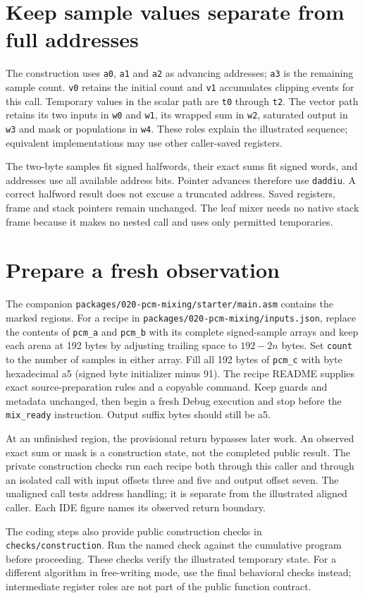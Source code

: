\section{Keep sample values separate from full addresses}
The construction uses \texttt{a0}, \texttt{a1} and \texttt{a2} as advancing addresses;
\texttt{a3} is the remaining sample count. \texttt{v0} retains the initial count and
\texttt{v1} accumulates clipping events for this call. Temporary values in the scalar
path are \texttt{t0} through \texttt{t2}. The vector path retains its two inputs in
\texttt{w0} and \texttt{w1}, its wrapped sum in \texttt{w2}, saturated output in
\texttt{w3} and mask or populations in \texttt{w4}. These roles explain the illustrated
sequence; equivalent implementations may use other caller-saved registers.

The two-byte samples fit signed halfwords, their exact sums fit signed words, and
addresses use all available address bits. Pointer advances therefore use
\texttt{daddiu}. A correct halfword result does not excuse a truncated address.
Saved registers, frame and stack pointers remain unchanged. The leaf mixer needs no
native stack frame because it makes no nested call and uses only permitted temporaries.

\section{Prepare a fresh observation}
The companion \texttt{packages/020-pcm-mixing/starter/main.asm} contains the marked regions.
For a recipe in \texttt{packages/020-pcm-mixing/inputs.json}, replace the contents of
\texttt{pcm\_a} and \texttt{pcm\_b} with its complete signed-sample arrays and keep
each arena at 192 bytes by adjusting trailing space to \(192-2n\) bytes. Set
\texttt{count} to the number of samples in either array. Fill all 192 bytes of
\texttt{pcm\_c} with byte hexadecimal a5 (signed byte initializer minus 91).
The recipe README supplies exact source-preparation rules and a copyable command.
Keep guards and metadata unchanged, then begin a fresh Debug execution and stop
before the \texttt{mix\_ready} instruction. Output suffix bytes should still be a5.

At an unfinished region, the provisional return bypasses later work. An observed
exact sum or mask is a construction state, not the completed public result. The
private construction checks run each recipe both through this caller and through
an isolated call with input offsets three and five and output offset seven. The
unaligned call tests address handling; it is separate from the illustrated aligned
caller. Each IDE figure names its observed return boundary.

The coding steps also provide public construction checks in
\texttt{checks/construction}. Run the named check against the cumulative program
before proceeding. These checks verify the illustrated temporary state. For a different
algorithm in free-writing mode, use the final behavioral checks instead; intermediate
register roles are not part of the public function contract.

